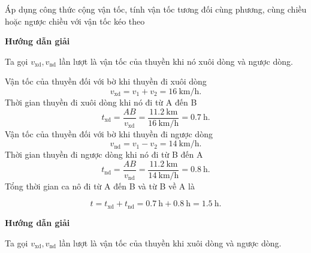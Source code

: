 \begin{dang}{Áp dụng công thức cộng vận tốc, tính vận tốc tương đối cùng phương, cùng chiều hoặc ngược chiều với vận tốc kéo theo}
	{	\begin{center}
			\textbf{Hướng dẫn giải}
		\end{center}
		
		Ta gọi $v_{\text{xd}}, v_{\text{nd}}$ lần lượt là vận tốc của thuyền khi nó xuôi dòng và ngược dòng.
		
		Vận tốc của thuyền đối với bờ khi thuyền đi xuôi dòng 
		$$v_{\text{xd}}=v_1+v_2 = \SI{16}{\kilo\meter/\hour}.$$
		Thời gian thuyền đi xuôi dòng khi nó đi từ A đến B
		$$t_{\text{xd}}=\dfrac{AB}{v_{\text{xd}}}=\dfrac{\SI{11.2}{\kilo\meter}}{\SI{16}{\kilo\meter/\hour}}=\SI{0.7}{\hour}.$$
		Vận tốc của thuyền đối với bờ khi thuyền đi ngược dòng 
		$$v_{\text{nd}}=v_1-v_2 = \SI{14}{\kilo\meter/\hour}.$$
		Thời gian thuyền đi ngược dòng khi nó đi từ B đến A
		$$t_{\text{nd}}=\dfrac{AB}{v_{\text{nd}}}=\dfrac{\SI{11.2}{\kilo\meter}}{\SI{14}{\kilo\meter/\hour}}=\SI{0.8}{\hour}.$$
		Tổng thời gian ca nô đi từ A đến B và từ B về A là
		
		$$t= t_{\text{xd}}+ t_{\text{nd}}=\SI{0.7}{\hour}+\SI{0.8}{\hour}=\SI{1.5}{\hour}.$$
	}
	{	\begin{center}
			\textbf{Hướng dẫn giải}
		\end{center}
		
		Ta gọi $v_{\text{xd}}, v_{\text{nd}}$ lần lượt là vận tốc của thuyền khi xuôi dòng và ngược dòng.
		
}
\end{dang}
